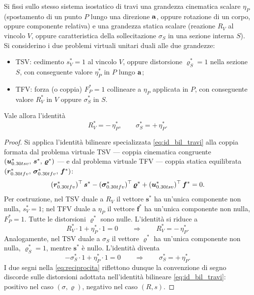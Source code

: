 \begin{teorema}
	\label{thm:reciprocita}
	Si fissi sullo stesso sistema isostatico di travi una grandezza 
	cinematica scalare $\eta_P$ (spostamento di un punto $P$ lungo 
	una direzione $\mathbf{a}$, oppure rotazione di un corpo, oppure 
	componente relativa) e una grandezza statica scalare 
	(reazione $R_V$ al vincolo $V$, oppure caratteristica della 
	sollecitazione $\sigma_S$ in una sezione interna $S$). Si 
	considerino i due problemi virtuali unitari duali alle due 
	grandezze:
	\begin{itemize}[noitemsep,topsep=2pt]
		\item TSV: cedimento $s^{*}_V = 1$ al vincolo $V$, oppure 
		distorsione $\varrho^{*}_S = 1$ nella sezione $S$, con 
		conseguente valore $\eta^{*}_P$ in $P$ lungo $\mathbf{a}$;
		\item TFV: forza (o coppia) $F^{*}_P = 1$ collineare a 
		$\eta_P$ applicata in $P$, con conseguente valore 
		$R^{*}_V$ in $V$ oppure $\sigma^{*}_S$ in $S$.
	\end{itemize}
	Vale allora l'identità
	\begin{equation}\label{eq:reciprocita}
		\boxed{\,
			R^{*}_V = -\,\eta^{*}_P,
			\qquad
			\sigma^{*}_S = +\,\eta^{*}_P.\,}
	\end{equation}
\end{teorema}

\begin{proof}
	Si applica l'identità bilineare specializzata 
	\eqref{eq:id_bil_travi} alla coppia formata dal problema 
	virtuale TSV --- coppia cinematica congruente $(\bm{u}^{*}_{0.30 
		tsv},\, \bm{s}^{*},\, \bm{\varrho}^{*})$ --- e dal problema 
	virtuale TFV --- coppia statica equilibrata $(\bm{r}^{*}_{0.30 
		tfv},\, \bm{\sigma}^{*}_{0.30 tfv},\, \bm{f}^{*})$:
	\begin{equation*}
		(\bm{r}^{*}_{0.30 tfv})^\top\,\bm{s}^{*}
		- (\bm{\sigma}^{*}_{0.30 tfv})^\top\,\bm{\varrho}^{*}
		+ (\bm{u}^{*}_{0.30 tsv})^\top\,\bm{f}^{*} = 0.
	\end{equation*}
	Per costruzione, nel TSV duale a $R_V$ il vettore 
	$\bm{s}^{*}$ ha un'unica componente non nulla, $s^{*}_V = 1$; 
	nel TFV duale a $\eta_P$ il vettore $\bm{f}^{*}$ ha un'unica 
	componente non nulla, $F^{*}_P = 1$. Tutte le distorsioni 
	$\bm{\varrho}^{*}$ sono nulle. L'identità si riduce a
	\begin{equation*}
		R^{*}_V \cdot 1 + \eta^{*}_P \cdot 1 = 0
		\qquad\Longrightarrow\qquad
		R^{*}_V = -\,\eta^{*}_P.
	\end{equation*}
	Analogamente, nel TSV duale a $\sigma_S$ il vettore 
	$\bm{\varrho}^{*}$ ha un'unica componente non nulla, 
	$\varrho^{*}_S = 1$, mentre $\bm{s}^{*}$ è nullo. L'identità 
	diventa
	\begin{equation*}
		-\sigma^{*}_S \cdot 1 + \eta^{*}_P \cdot 1 = 0
		\qquad\Longrightarrow\qquad
		\sigma^{*}_S = +\,\eta^{*}_P.
	\end{equation*}
	I due segni nella \eqref{eq:reciprocita} riflettono dunque la 
	convenzione di segno discorde sulle distorsioni adottata 
	nell'identità bilineare \eqref{eq:id_bil_travi}: positivo nel 
	caso $(\sigma, \varrho)$, negativo nel caso $(R, s)$.
\end{proof}

